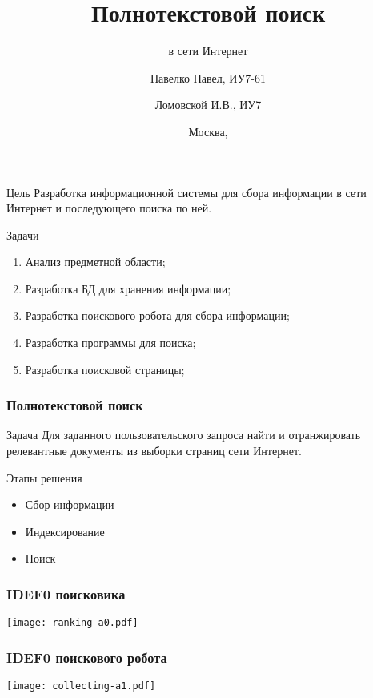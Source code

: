 \documentclass[hyperref={unicode}, 14pt]{beamer}
\title{Полнотекстовой поиск}
\subtitle{в сети Интернет}
\author[Павелко Павел]{Павелко Павел, ИУ7-61 \and Ломовской И.В., ИУ7}
\institute[]{МГТУ им. Баумана}
\date{Москва, \the\year}
\begin{document}
\begin{frame}
  \titlepage
\end{frame}

\begin{frame}
  \begin{block}{Цель}
    Разработка информационной системы для сбора информации в сети Интернет и последующего поиска по ней.
  \end{block}

  \begin{block}{Задачи}
    \begin{enumerate}
      \item Анализ предметной области;
      \item Разработка БД для хранения информации;
      \item Разработка поискового робота для сбора информации;
      \item Разработка программы для поиска;
      \item Разработка поисковой страницы;
    \end{enumerate}
  \end{block}
\end{frame}

\begin{frame}
  \frametitle{Полнотекстовой поиск}

  \begin{block}{Задача}
    Для заданного пользовательского запроса найти и отранжировать релевантные документы из выборки страниц сети Интернет.
  \end{block}

  \begin{block}{Этапы решения}
    \begin{itemize}
      \item Сбор информации
      \item Индексирование
      \item Поиск
    \end{itemize}
  \end{block}
\end{frame}

\begin{frame}
  \frametitle{IDEF0 поисковика}

  \begin{center}
    \texttt{[image: ranking-a0.pdf]}
  \end{center}
\end{frame}

\begin{frame}
  \frametitle{IDEF0 поискового робота}

  \begin{center}
    \texttt{[image: collecting-a1.pdf]}
  \end{center}
\end{frame}
\end{document}
